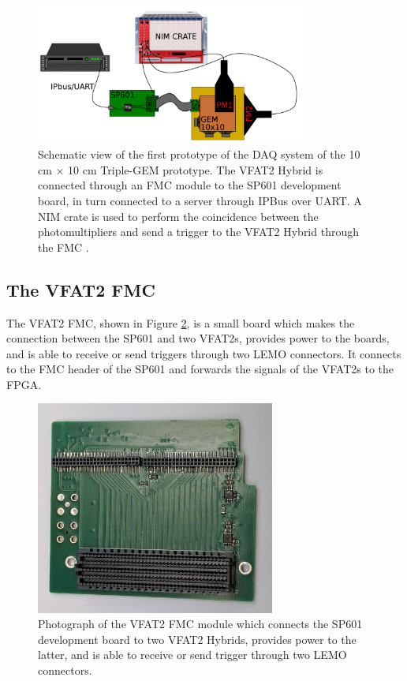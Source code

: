     \begin{figure}[h!]
      \centering
      \includegraphics[width=0.8\textwidth]{img/III-1-arch/sys_1.png}
      \caption{Schematic view of the first prototype of the DAQ system of the 10 cm $ \times $ 10 cm Triple-GEM prototype. The VFAT2 Hybrid is connected through an FMC module to the SP601 development board, in turn connected to a server through IPBus over UART. A NIM crate is used to perform the coincidence between the photomultipliers and send a trigger to the VFAT2 Hybrid through the FMC \cite{Leonard:2065693}.}
      \label{fig:III-1-sys-1}
    \end{figure}

    \subsection{The VFAT2 FMC}

      The VFAT2 FMC, shown in Figure \ref{fig:III-1-fmc}, is a small board which makes the connection between the SP601 and two VFAT2s, provides power to the boards, and is able to receive or send triggers through two LEMO connectors. It connects to the FMC header of the SP601 and forwards the signals of the VFAT2s to the FPGA.

      \begin{figure}[h!]
        \centering
        \includegraphics[width=0.7\textwidth]{img/III-1-arch/fmc.jpg}
        \caption{Photograph of the VFAT2 FMC module which connects the SP601 development board to two VFAT2 Hybrids, provides power to the latter, and is able to receive or send trigger through two LEMO connectors.}
        \label{fig:III-1-fmc}
      \end{figure}

